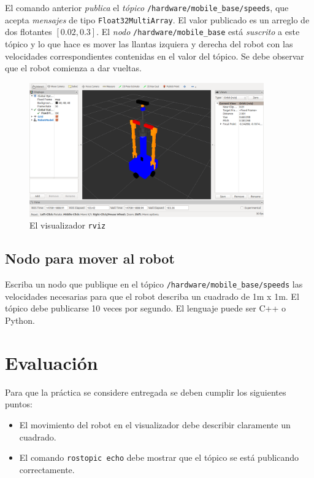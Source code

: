 \documentclass[letterpaper,12pt]{article}
\begin{document}
El comando anterior \textit{publica} el \textit{tópico} \texttt{/hardware/mobile\_base/speeds}, que acepta \textit{mensajes} de tipo \texttt{Float32MultiArray}. El valor publicado es un arreglo de dos flotantes $[0.02, 0.3]$. El \textit{nodo} \texttt{/hardware/mobile\_base} está \textit{suscrito} a este tópico y lo que hace es mover las llantas izquiera y derecha del robot con las velocidades correspondientes contenidas en el valor del tópico. Se debe observar que el robot comienza a dar vueltas. 

\begin{figure}
\centering
\includegraphics[width=0.9\textwidth]{rviz_initial.png}
\caption{El visualizador \texttt{rviz}}
\label{fig:rviz}
\end{figure}

\subsection{Nodo para mover al robot}
Escriba un nodo que publique en el tópico \texttt{/hardware/mobile\_base/speeds} las velocidades necesarias para que el robot describa un cuadrado de 1m x 1m. El tópico debe publicarse 10 veces por segundo. El lenguaje puede ser C++ o Python.

\section{Evaluación}
Para que la práctica se considere entregada se deben cumplir los siguientes puntos:
\begin{itemize}
\item El movimiento del robot en el visualizador debe describir claramente un cuadrado.
\item El comando \texttt{rostopic echo} debe mostrar que el tópico se está publicando correctamente.
\end{itemize}
\end{document}
